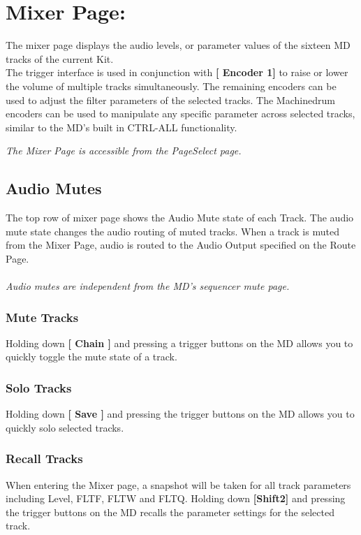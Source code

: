\chapter{Mixer Page:}
The mixer page displays the audio levels, or parameter values of the sixteen MD tracks of the current Kit.
\\
The trigger interface is used in conjunction with \textbf{[ Encoder 1]} to raise or lower the volume of multiple tracks simultaneously. The remaining encoders can be used to adjust the filter parameters of the selected tracks. The Machinedrum encoders can be used to manipulate any specific parameter across selected tracks, similar to the MD's built in CTRL-ALL functionality.


\textit{The Mixer Page is accessible from the PageSelect page.}


\section{Audio Mutes}

The top row of mixer page shows the Audio Mute state of each Track. The audio mute state changes the audio routing of muted tracks. When a track is muted from the Mixer Page, audio is routed to the Audio Output specified on the Route Page.\\
\\
\textit{Audio mutes are independent from the MD's sequencer mute page.}
\\
\subsection{Mute Tracks}
Holding down \textbf{[ Chain ]} and pressing a trigger buttons on the MD allows you to quickly toggle the mute state of a track.
\subsection{Solo Tracks}
Holding down \textbf{[ Save ]} and pressing the trigger buttons on the MD allows you to quickly solo selected tracks.
\subsection{Recall Tracks}
When entering the Mixer page, a snapshot will be taken for all track parameters including Level, FLTF, FLTW and FLTQ.
Holding down \textbf{[Shift2]} and pressing the trigger buttons on the MD recalls the parameter settings for the selected track.

